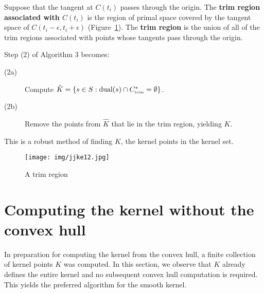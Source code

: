 \documentclass[12pt]{article}
\newif\ifJournal
\begin{document}
\begin{defn2}
Suppose that the tangent at $C(t_i)$ passes through the origin.
The {\bf trim region associated with $C(t_i)$} 
is the region of primal space covered by the tangent space
of $C(t_i - \epsilon, t_i + \epsilon)$ (Figure~\ref{fig:trimregion}).
The {\bf trim region} is the union of all of the
trim regions associated with points whose tangents pass through the origin.
\end{defn2}

Step (2) of Algorithm 3 becomes:

\begin{description}
\item[(2a)] Compute $\hat{K} = \{s \in S : \mbox{dual}(s) \cap C^*_{\mbox{\tiny{trim}}} = \emptyset\}$.
\item[(2b)] Remove the points from $\hat{K}$ that lie in the trim region,
	yielding $K$.
\end{description}

This is a robust method of finding $K$, the kernel points in the kernel set.
\ifJournal
The trim region is easily computed.
Let $L_1$ and $L_2$ be the tangents at $C(t_i - \epsilon)$ and $C(t_i + \epsilon)$
respectively
and define the inside of $L_1$ (resp., $L_2$) 
to be the side that contains $L_2$'s (resp., $L_1$'s) point of tangency.
The trim region associated with $C(t_i)$ 
is the region inside $L_1$ and outside $L_2$,
or inside $L_2$ and outside $L_1$.
\fi

\begin{figure}[h]
\begin{center}
\texttt{[image: img/jjke12.jpg]}
\end{center}
\caption{A trim region}
\label{fig:trimregion}
\end{figure}


\section{Computing the kernel without the convex hull}
\label{sec:nohull}

In preparation for computing the kernel from the convex hull, 
a finite collection of kernel points $K$ was computed.
In this section, we observe that $K$ already defines the entire kernel
and no subsequent convex hull computation is required.
This yields the preferred algorithm for the smooth kernel.
\end{document}
